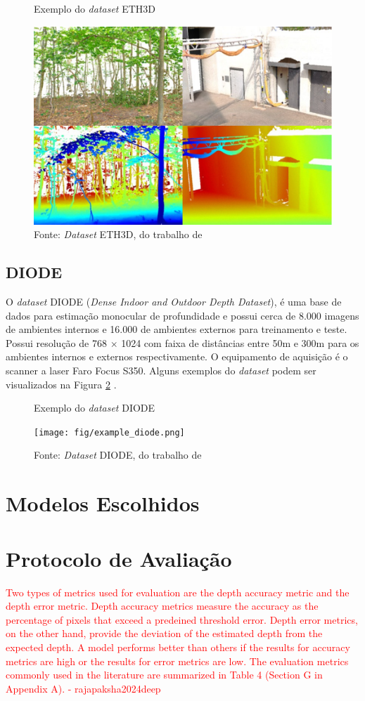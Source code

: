\begin{figure}[h]
    \centering
    \caption{Exemplo do \textit{dataset} ETH3D}
    \includegraphics[width=.6\textwidth]{fig/eth3d_example.png}
    \caption*{Fonte: \textit{Dataset} ETH3D, do trabalho de }
    \label{fig:eth3dexample}
\end{figure}


\subsection{DIODE}

O \textit{dataset} DIODE (\textit{Dense Indoor and Outdoor Depth Dataset}), é uma base de dados para estimação monocular de profundidade e possui cerca de 8.000 imagens de ambientes internos e 16.000 de ambientes externos para treinamento e teste. Possui resolução de 768 $\times$ 1024 com faixa de distâncias entre 50m e 300m para os ambientes internos e externos respectivamente. O equipamento de aquisição é o scanner a laser Faro Focus S350. Alguns exemplos do \textit{dataset} podem ser visualizados na Figura \ref{exdiode} \cite{diode_dataset}.

\begin{figure}[h]
    \centering
    \caption{Exemplo do \textit{dataset} DIODE}
    \texttt{[image: fig/example\_diode.png]}
    \caption*{Fonte: \textit{Dataset} DIODE, do trabalho de }
    \label{exdiode}
\end{figure}

\section{Modelos Escolhidos}

\section{Protocolo de Avaliação}


\textcolor{red}{Two types of metrics used for evaluation are the depth accuracy metric and the depth error metric. Depth accuracy
metrics measure the accuracy as the percentage of pixels that exceed a predeined threshold error. Depth error
metrics, on the other hand, provide the deviation of the estimated depth from the expected depth. A model
performs better than others if the results for accuracy metrics are high or the results for error metrics are low.
The evaluation metrics commonly used in the literature are summarized in Table 4 (Section G in Appendix A). - rajapaksha2024deep}


